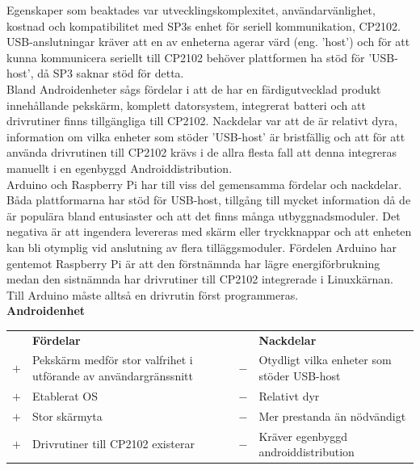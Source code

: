 \documentclass{article}
\begin{document}
            \noindent Egenskaper som beaktades var utvecklingskomplexitet, användarvänlighet, kostnad och kompatibilitet med SP3s enhet för seriell kommunikation, CP2102. USB-anslutningar kräver att en av enheterna agerar värd (eng. 'host') och för att kunna kommunicera seriellt till CP2102 behöver plattformen ha stöd för 'USB-host', då SP3 saknar stöd för detta. \\
            
            \noindent Bland Androidenheter sågs fördelar i att de har en färdigutvecklad produkt innehållande pekskärm, komplett datorsystem, integrerat batteri och att drivrutiner finns tillgängliga till CP2102. Nackdelar var att de är relativt dyra, information om vilka enheter som stöder 'USB-host' är bristfällig och att för att använda drivrutinen till CP2102 krävs i de allra flesta fall att denna integreras manuellt i en egenbyggd Androiddistribution. \\
            
            \noindent Arduino och Raspberry Pi har till viss del gemensamma fördelar och nackdelar. Båda plattformarna har stöd för USB-host, tillgång till mycket information då de är populära bland entusiaster och att det finns många utbyggnadsmoduler. Det negativa är att ingendera levereras med skärm eller tryckknappar och att enheten kan bli otymplig vid anslutning av flera tilläggsmoduler. Fördelen Arduino har gentemot Raspberry Pi är att den förstnämnda har lägre energiförbrukning medan den sistnämnda har drivrutiner till CP2102 integrerade i Linuxkärnan. Till Arduino måste alltså en drivrutin först programmeras. \\


            \noindent\textsf{\textbf{Androidenhet}}\\
            \begin{tabularx}{\textwidth}{@{}cXcX}
                & \textbf{Fördelar}     & & \textbf{Nackdelar} \\
                $+$ & Pekskärm medför stor valfrihet i utförande av användargränssnitt     &                            $-$ & Otydligt vilka enheter som
                                                  stöder USB-host \\
                $+$ &  Etablerat OS     &   $-$ & Relativt dyr \\
                $+$ &  Stor skärmyta    &   $-$ & Mer prestanda än nödvändigt \\
                $+$ &  Drivrutiner till CP2102 existerar &
                                            $-$ & Kräver egenbyggd androiddistribution \\
            \end{tabularx}\\
\end{document}
